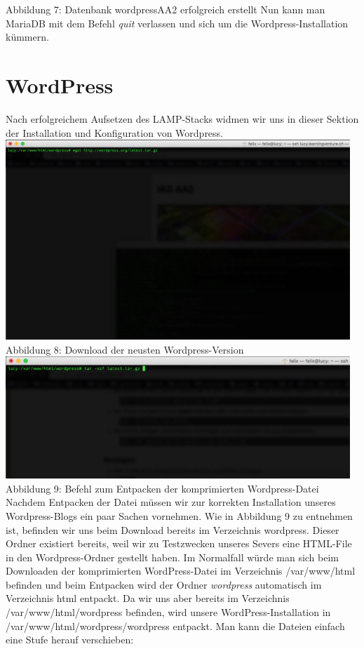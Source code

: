 \documentclass{article}
\begin{document}
	Abbildung 7: Datenbank wordpressAA2 erfolgreich erstellt
	\newline
	\newline
	Nun kann man MariaDB mit dem Befehl \textit{quit} verlassen und sich um die Wordpress-Installation kümmern.
	
	\section{WordPress}
	Nach erfolgreichem Aufsetzen des LAMP-Stacks widmen wir uns in dieser Sektion der Installation und Konfiguration von Wordpress.
	\newline
	\newline
	\includegraphics[width=13cm]{../Pics/30-wordpress-download}
	Abbildung 8: Download der neusten Wordpress-Version
	\newline
	\newline
	\includegraphics[width=13cm]{../Pics/32-wordpress-unzip}
	Abbildung 9: Befehl zum Entpacken der komprimierten Wordpress-Datei
	\newline
	\newline
	Nachdem Entpacken der Datei müssen wir zur korrekten Installation unseres Wordpress-Blogs ein paar Sachen vornehmen.
	\newline
	Wie in Abbildung 9 zu entnehmen ist, befinden wir uns beim Download bereits im Verzeichnis wordpress. Dieser Ordner existiert bereits, weil wir zu Testzwecken unseres Severs eine HTML-File in den Wordpress-Ordner gestellt haben. Im Normalfall würde man sich beim Downloaden der komprimierten WordPress-Datei im Verzeichnis /var/www/html befinden und beim Entpacken wird der Ordner \textit{wordpress} automatisch im Verzeichnis html entpackt. Da wir uns aber bereits im Verzeichnis /var/www/html/wordpress befinden, wird unsere WordPress-Installation in /var/www/html/wordpress/wordpress entpackt. Man kann die Dateien einfach eine Stufe herauf verschieben:
\end{document}
